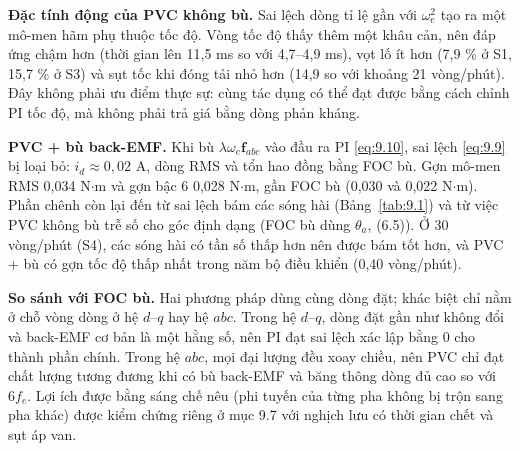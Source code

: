 \textbf{Đặc tính động của PVC không bù.} Sai lệch dòng tỉ lệ gần với $\omega_e^2$ tạo ra một mô-men hãm phụ thuộc tốc độ. Vòng tốc độ thấy thêm một khâu cản, nên đáp ứng chậm hơn (thời gian lên 11,5 ms so với 4,7–4,9 ms), vọt lố ít hơn (7,9 \% ở S1, 15,7 \% ở S3) và sụt tốc khi đóng tải nhỏ hơn (14,9 so với khoảng 21 vòng/phút). Đây không phải ưu điểm thực sự: cùng tác dụng có thể đạt được bằng cách chỉnh PI tốc độ, mà không phải trả giá bằng dòng phản kháng.

\textbf{PVC + bù back-EMF.} Khi bù $\lambda\omega_e\mathbf{f}_{abc}$ vào đầu ra PI \eqref{eq:9.10}, sai lệch \eqref{eq:9.9} bị loại bỏ: $i_d \approx 0{,}02$ A, dòng RMS và tổn hao đồng bằng FOC bù. Gợn mô-men RMS 0,034 N$\cdot$m và gợn bậc 6 0,028 N$\cdot$m, gần FOC bù (0,030 và 0,022 N$\cdot$m). Phần chênh còn lại đến từ sai lệch bám các sóng hài (Bảng~\ref{tab:9.1}) và từ việc PVC không bù trễ số cho góc định dạng (FOC bù dùng $\theta_a$, (6.5)). Ở 30 vòng/phút (S4), các sóng hài có tần số thấp hơn nên được bám tốt hơn, và PVC + bù có gợn tốc độ thấp nhất trong năm bộ điều khiển (0,40 vòng/phút).

\textbf{So sánh với FOC bù.} Hai phương pháp dùng cùng dòng đặt; khác biệt chỉ nằm ở chỗ vòng dòng ở hệ $d$–$q$ hay hệ $abc$. Trong hệ $d$–$q$, dòng đặt gần như không đổi và back-EMF cơ bản là một hằng số, nên PI đạt sai lệch xác lập bằng 0 cho thành phần chính. Trong hệ $abc$, mọi đại lượng đều xoay chiều, nên PVC chỉ đạt chất lượng tương đương khi có bù back-EMF và băng thông dòng đủ cao so với $6f_e$. Lợi ích được bằng sáng chế nêu (phi tuyến của từng pha không bị trộn sang pha khác) được kiểm chứng riêng ở mục 9.7 với nghịch lưu có thời gian chết và sụt áp van.

